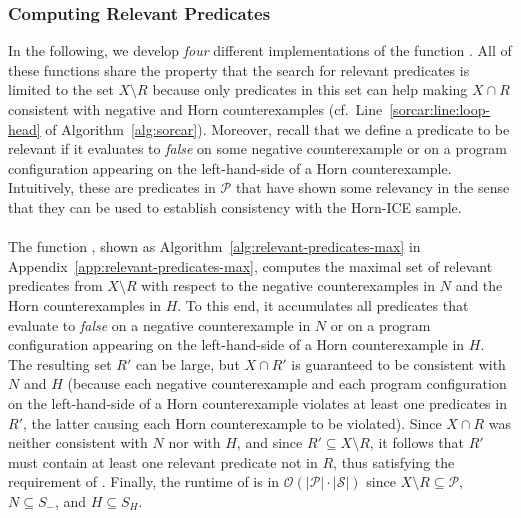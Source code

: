 
\subsubsection{Computing Relevant Predicates}

In the following, we develop \emph{four} different implementations of the function \RelevantPredicates. %
All of these functions share the property that the search for relevant predicates is limited to the set $X \setminus R$ because only predicates in this set can help making $X \cap R$ consistent with negative and Horn counterexamples (cf.\ Line~\ref{sorcar:line:loop-head} of Algorithm~\ref{alg:sorcar}).
Moreover, recall that we define a predicate to be relevant if it evaluates to \textit{false} on some negative counterexample or on a program configuration appearing on the left-hand-side of a Horn counterexample.
Intuitively, these are predicates in $\mathcal P$ that have shown some relevancy in the sense that they can be used to establish consistency with the Horn-ICE sample.


\paragraph*{\protect{\RelevantPredicatesMax}}
The function \RelevantPredicatesMax, shown as Algorithm~\ref{alg:relevant-predicates-max} in Appendix~\ref{app:relevant-predicates-max}, computes the maximal set of relevant predicates from $X \setminus R$ with respect to the negative counterexamples in $N$ and the Horn counterexamples in $H$.
To this end, it accumulates all predicates that evaluate to \textit{false} on a negative counterexample in $N$ or on a program configuration appearing on the left-hand-side of a Horn counterexample in $H$.
The resulting set $R'$ can be large, but $X \cap R'$ is guaranteed to be consistent with $N$ and $H$ (because each negative counterexample and each program configuration on the left-hand-side of a Horn counterexample violates at least one predicates in $R'$, the latter causing each Horn counterexample to be violated).
Since $X \cap R$ was neither consistent with $N$ nor with $H$, and since $R'\subseteq X \setminus R$, it follows that $R'$ must contain at least one relevant predicate not in $R$, thus satisfying the requirement of \RelevantPredicates.
Finally, the runtime of \RelevantPredicatesMax is in $\mathcal O(|\mathcal P| \cdot |\mathcal S|)$ since $X \setminus R \subseteq \mathcal P$, $N \subseteq S_-$, and $H \subseteq S_H$.


